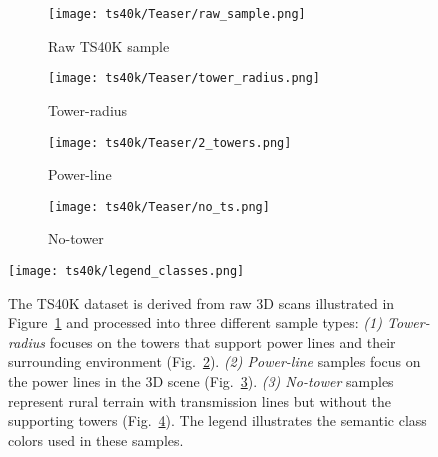 \begin{figure}[ht]
      \centering

      \begin{subfigure}[b]{\textwidth}
            \texttt{[image: ts40k/Teaser/raw\_sample.png]}
            \caption{Raw TS40K sample}
            \label{fig:teaser-raw-sample}
      \end{subfigure}

      \vspace{0.5em}

      \begin{subfigure}[b]{0.32\textwidth}
            \texttt{[image: ts40k/Teaser/tower\_radius.png]}
            \caption{Tower-radius}
            \label{fig:teaser-tower-radius}
      \end{subfigure}
      \hfill
      \begin{subfigure}[b]{0.32\textwidth}
            \texttt{[image: ts40k/Teaser/2\_towers.png]}
            \caption{Power-line}
            \label{fig:teaser-power-line}
      \end{subfigure}
      \hfill
      \begin{subfigure}[b]{0.32\textwidth}
            \texttt{[image: ts40k/Teaser/no\_ts.png]}
            \caption{No-tower}
            \label{fig:teaser-no-ts}
      \end{subfigure}

      \vspace{0.5em}

      \texttt{[image: ts40k/legend\_classes.png]}

      \caption[TS40K dataset overview]{The TS40K dataset is derived from raw 3D scans
            illustrated in Figure~\ref{fig:teaser-raw-sample} and processed into
            three different sample types: \textit{(1) Tower-radius} focuses on the
            towers that support power lines and their surrounding environment
            (Fig.~\ref{fig:teaser-tower-radius}). \textit{(2) Power-line} samples
            focus on the power lines in the 3D scene (Fig.~\ref{fig:teaser-power-line}).
            \textit{(3) No-tower} samples represent rural terrain with transmission lines
            but without the supporting towers (Fig.~\ref{fig:teaser-no-ts}).
            The legend illustrates the semantic class colors used in these samples.}
      \label{fig:teaser}
\end{figure}

